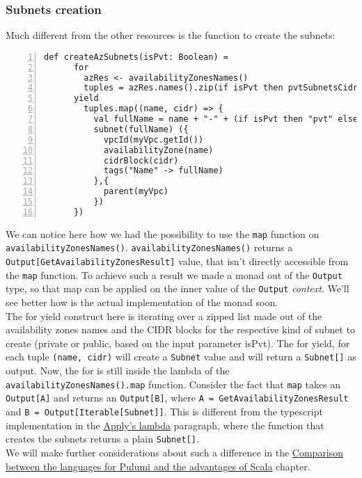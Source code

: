 \subsubsection{Subnets creation}
\label{sssec:subnets-creation}
Much different from the other resources is the function to create the subnets:\\
\begin{minipage}{\linewidth}
\begin{lstlisting}[numbers=left, numberstyle=\tiny, numbersep=-5pt, stepnumber=1,linewidth=420pt]
  def createAzSubnets(isPvt: Boolean) =
      for
        azRes <- availabilityZonesNames()
        tuples = azRes.names().zip(if isPvt then pvtSubnetsCidrs else pubSubnetsCidrs)
      yield
        tuples.map((name, cidr) => {
          val fullName = name + "-" + (if isPvt then "pvt" else "pub") + "-subnet-scala"
          subnet(fullName) ({
            vpcId(myVpc.getId())
            availabilityZone(name)
            cidrBlock(cidr)
            tags("Name" -> fullName)
          },{
            parent(myVpc)
          })
      })
\end{lstlisting}
\end{minipage}
We can notice here how we had the possibility to use the \texttt{map} function on \texttt{availabilityZonesNames()}.
\texttt{availabilityZonesNames()} returns a \texttt{Output[GetAvailabilityZonesResult]} value, that isn't directly accessible from the \texttt{map} function.
To achieve such a result we made a monad out of the \texttt{Output} type, so that map can be applied on the inner value of the \texttt{Output} \textit{context}.
We'll see better how is the actual implementation of the monad soon.\\
The for yield construct here is iterating over a zipped list made out of the availability zones names and the CIDR blocks for the respective kind of subnet to create (private or public, based on the input parameter isPvt).
The for yield, for each tuple \texttt{(name, cidr)} will create a \texttt{Subnet} value and will return a \texttt{Subnet[]} as output.
Now, the for is still inside the lambda of the \texttt{availabilityZonesNames().map} function.
Consider the fact that \texttt{map} takes an \texttt{Output[A]} and returns an \texttt{Output[B]}, where \texttt{A = GetAvailabilityZonesResult} and \texttt{B = Output[Iterable[Subnet]]}.
This is different from the typescript implementation in the \hyperref[par:ts-lambda]{Apply's lambda} paragraph, where the function that creates the subnets returns a plain \texttt{Subnet[]}.\\
We will make further considerations about such a difference in the \hyperref[cap:comparisons]{Comparison between the languages for Pulumi and the advantages of Scala} chapter.\\

